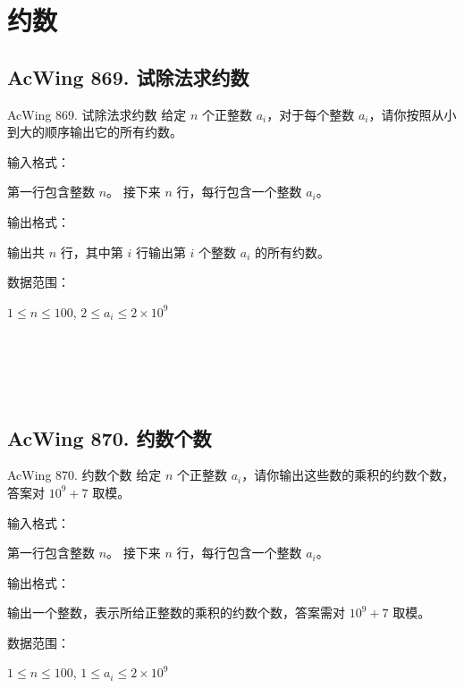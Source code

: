 \section{约数}

\subsection{AcWing 869. 试除法求约数}
\begin{titledbox}{AcWing 869. 试除法求约数}
    给定 $n$ 个正整数 $a_i$，对于每个整数 $a_i$，请你按照从小到大的顺序输出它的所有约数。

    输入格式：

    第一行包含整数 $n$。 接下来 $n$ 行，每行包含一个整数 $a_i$。

    输出格式：

    输出共 $n$ 行，其中第 $i$ 行输出第 $i$ 个整数 $a_i$ 的所有约数。

    数据范围：

    $1 \le n \le 100$, $2 \le a_i \le 2 \times 10^9$

    \begin{inputblock}
         \\
         \\
    \end{inputblock}
    \begin{outputblock}
         \\
    \end{outputblock}
\end{titledbox}

\subsection{AcWing 870. 约数个数}

\begin{titledbox}{AcWing 870. 约数个数}
    给定 $n$ 个正整数 $a_i$，请你输出这些数的乘积的约数个数，答案对 $10^9+7$ 取模。

    输入格式：

    第一行包含整数 $n$。 接下来 $n$ 行，每行包含一个整数 $a_i$。

    输出格式：

    输出一个整数，表示所给正整数的乘积的约数个数，答案需对 $10^9+7$ 取模。

    数据范围：

    $1 \le n \le 100$, $1 \le a_i \le 2 \times 10^9$

    \begin{inputblock}
         \\
         \\
         \\
    \end{inputblock}
    \begin{outputblock}
    \end{outputblock}
\end{titledbox}

